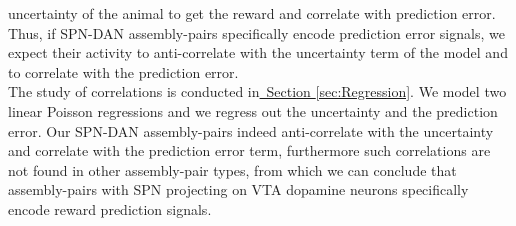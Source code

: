 {uncertainty of the animal to get the reward and correlate with prediction error.\\Thus, if SPN-DAN assembly-pairs specifically encode prediction error signals, we expect their activity to anti-correlate with the uncertainty term of the model and to correlate with the prediction error.\\The study of correlations is conducted in\hyperref[sec:Regression]{~Section \ref*{sec:Regression}}. We model two linear Poisson regressions and we regress out the uncertainty and the prediction error. Our SPN-DAN assembly-pairs indeed anti-correlate with the uncertainty and correlate with the prediction error term, furthermore such correlations are not found in other assembly-pair types, from which we can conclude that assembly-pairs with SPN projecting on VTA dopamine neurons specifically encode reward prediction signals.}
